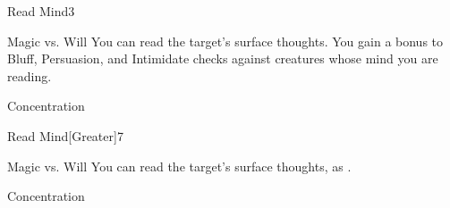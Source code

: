 \begin{spellsection}{Read Mind}{3}
\begin{spellheader}
    \spellrng{\rngmed}
\end{spellheader}
\begin{spellcontent}
    \begin{spelltargetinginfo}
    \end{spelltargetinginfo}
    \begin{spelleffects}
        \begin{spellattack}{Magic vs. Will}
            \spellsuccess You can read the target's surface thoughts. You gain a  bonus to Bluff, Persuasion, and Intimidate checks against creatures whose mind you are reading.
        \end{spellattack}
        \spelldur Concentration
    \end{spelleffects}
\end{spellcontent}
\begin{spellfooter}
\end{spellfooter}
\end{spellsection}

\begin{spellsection}{Read Mind}[Greater]{7}
\begin{spellheader}
    \spellrng{\rngmed}
\end{spellheader}
\begin{spellcontent}
    \begin{spelltargetinginfo}
    \end{spelltargetinginfo}
    \begin{spelleffects}
        \begin{spellattack}{Magic vs. Will}
            \spelleffect You can read the target's surface thoughts, as .
        \end{spellattack}
        \spelldur Concentration
    \end{spelleffects}
\end{spellcontent}
\begin{spellfooter}
\end{spellfooter}
\end{spellsection}


